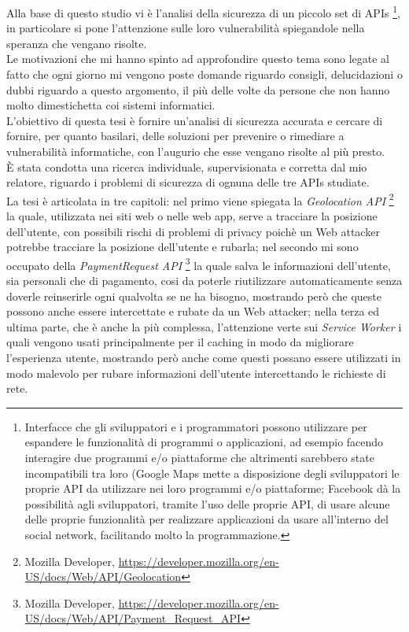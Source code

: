 \documentclass[11pt ,a4paper , twoside , openright ]{book}
\begin{document}
	Alla base di questo studio vi è l'analisi della sicurezza di un piccolo set di APIs \footnote{Interfacce che gli sviluppatori e i programmatori possono utilizzare per espandere le funzionalità di programmi o applicazioni, ad esempio facendo interagire due programmi e/o piattaforme che altrimenti sarebbero state incompatibili tra loro (Google Maps mette a disposizione degli sviluppatori le proprie API da utilizzare nei loro programmi e/o piattaforme; Facebook dà la possibilità agli sviluppatori, tramite l'uso delle proprie API, di usare alcune delle proprie funzionalità per realizzare applicazioni da usare all'interno del social network, facilitando molto la programmazione.}, in particolare si pone l'attenzione sulle loro vulnerabilità spiegandole nella speranza che vengano risolte.
	\\
	Le motivazioni che mi hanno spinto ad approfondire questo tema sono legate al fatto che ogni giorno mi vengono poste domande riguardo consigli, delucidazioni o dubbi riguardo a questo argomento, il più delle volte da persone che non hanno molto dimestichetta coi sistemi informatici.
	\\
	L'obiettivo di questa tesi è fornire un'analisi di sicurezza accurata e cercare di fornire, per quanto basilari, delle soluzioni per prevenire o rimediare a vulnerabilità informatiche, con l'augurio che esse vengano risolte al più presto.
	\\
	È stata condotta una ricerca individuale, supervisionata e corretta dal mio relatore, riguardo i problemi di sicurezza di ognuna delle tre APIs studiate.
	\\
	La tesi è articolata in tre capitoli: nel primo viene spiegata la \textit{Geolocation API} \footnote{Mozilla Developer, \url{https://developer.mozilla.org/en-US/docs/Web/API/Geolocation}} la quale, utilizzata nei siti web o nelle web app, serve a tracciare la posizione dell'utente, con possibili rischi di problemi di privacy poichè un Web attacker potrebbe tracciare la posizione dell'utente e rubarla; nel secondo mi sono occupato della \textit{PaymentRequest API} \footnote{Mozilla Developer, \url{https://developer.mozilla.org/en-US/docs/Web/API/Payment_Request_API}} la quale salva le informazioni dell'utente, sia personali che di pagamento, cosi da poterle riutilizzare automaticamente senza doverle reinserirle ogni qualvolta se ne ha bisogno, mostrando però che queste possono anche essere intercettate e rubate da un Web attacker; nella terza ed ultima parte, che è anche la più complessa, l'attenzione verte sui \textit{Service Worker} i quali vengono usati principalmente per il caching in modo da migliorare l'esperienza utente, mostrando però anche come questi possano essere utilizzati in modo malevolo per rubare informazioni dell'utente intercettando le richieste di rete.
\end{document}
